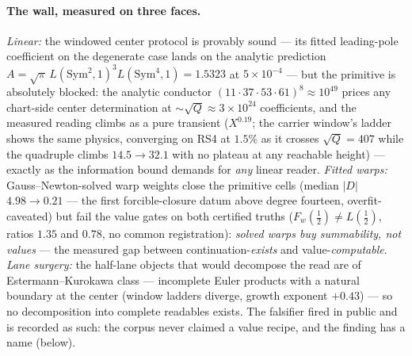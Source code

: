 \documentclass[11pt]{article}
\theoremstyle{definition}
\theoremstyle{remark}
\begin{document}
\paragraph{The wall, measured on three faces.} \emph{Linear:} the windowed
center protocol is provably sound --- its fitted leading-pole coefficient on
the degenerate case lands on the analytic prediction
$A=\sqrt\pi\,L(\mathrm{Sym}^2,1)^3L(\mathrm{Sym}^4,1)=1.5323$ at
$5\times10^{-4}$ --- but the primitive is absolutely blocked: the analytic
conductor $(11\cdot37\cdot53\cdot61)^8\approx10^{49}$ prices any chart-side
center determination at $\sim\!\sqrt Q\approx3\times10^{24}$ coefficients, and
the measured reading climbs as a pure transient ($X^{0.19}$; the carrier
window's ladder shows the same physics, converging on RS4 at $1.5\%$ as it
crosses $\sqrt Q=407$ while the quadruple climbs $14.5\to32.1$ with no
plateau at any reachable height) --- exactly as the information bound demands
for \emph{any} linear reader. \emph{Fitted warps:} Gauss--Newton-solved warp
weights close the primitive cells (median $|D|$ $4.98\to0.21$ --- the first
forcible-closure datum above degree fourteen, overfit-caveated) but fail the
value gates on both certified truths ($F_w(\tfrac12)\ne L(\tfrac12)$, ratios
$1.35$ and $0.78$, no common registration): \emph{solved warps buy
summability, not values} --- the measured gap between
continuation-\emph{exists} and value-\emph{computable}. \emph{Lane surgery:}
the half-lane objects that would decompose the read are of
Estermann--Kurokawa class \cite{Estermann,Kurokawa} --- incomplete Euler
products with a natural boundary at the center (window ladders diverge,
growth exponent $+0.43$) --- so no decomposition into complete readables
exists. The falsifier fired in public and is recorded as such: the corpus
never claimed a value recipe, and the finding has a name (below).
\end{document}
